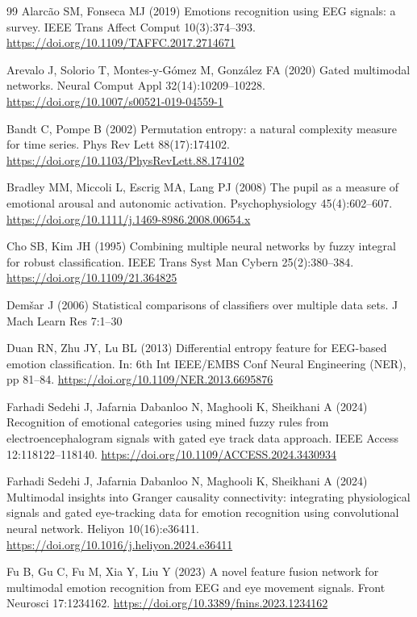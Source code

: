 \begin{thebibliography}{99}
 Alarc\~ao SM, Fonseca MJ (2019) Emotions recognition using EEG signals: a survey. IEEE Trans Affect Comput 10(3):374--393. \url{https://doi.org/10.1109/TAFFC.2017.2714671}

 Arevalo J, Solorio T, Montes-y-G\'omez M, Gonz\'alez FA (2020) Gated multimodal networks. Neural Comput Appl 32(14):10209--10228. \url{https://doi.org/10.1007/s00521-019-04559-1}

 Bandt C, Pompe B (2002) Permutation entropy: a natural complexity measure for time series. Phys Rev Lett 88(17):174102. \url{https://doi.org/10.1103/PhysRevLett.88.174102}

 Bradley MM, Miccoli L, Escrig MA, Lang PJ (2008) The pupil as a measure of emotional arousal and autonomic activation. Psychophysiology 45(4):602--607. \url{https://doi.org/10.1111/j.1469-8986.2008.00654.x}

 Cho SB, Kim JH (1995) Combining multiple neural networks by fuzzy integral for robust classification. IEEE Trans Syst Man Cybern 25(2):380--384. \url{https://doi.org/10.1109/21.364825}

 Dem\v{s}ar J (2006) Statistical comparisons of classifiers over multiple data sets. J Mach Learn Res 7:1--30

 Duan RN, Zhu JY, Lu BL (2013) Differential entropy feature for EEG-based emotion classification. In: 6th Int IEEE/EMBS Conf Neural Engineering (NER), pp 81--84. \url{https://doi.org/10.1109/NER.2013.6695876}

 Farhadi Sedehi J, Jafarnia Dabanloo N, Maghooli K, Sheikhani A (2024) Recognition of emotional categories using mined fuzzy rules from electroencephalogram signals with gated eye track data approach. IEEE Access 12:118122--118140. \url{https://doi.org/10.1109/ACCESS.2024.3430934}

 Farhadi Sedehi J, Jafarnia Dabanloo N, Maghooli K, Sheikhani A (2024) Multimodal insights into Granger causality connectivity: integrating physiological signals and gated eye-tracking data for emotion recognition using convolutional neural network. Heliyon 10(16):e36411. \url{https://doi.org/10.1016/j.heliyon.2024.e36411}

 Fu B, Gu C, Fu M, Xia Y, Liu Y (2023) A novel feature fusion network for multimodal emotion recognition from EEG and eye movement signals. Front Neurosci 17:1234162. \url{https://doi.org/10.3389/fnins.2023.1234162}


\end{thebibliography}
